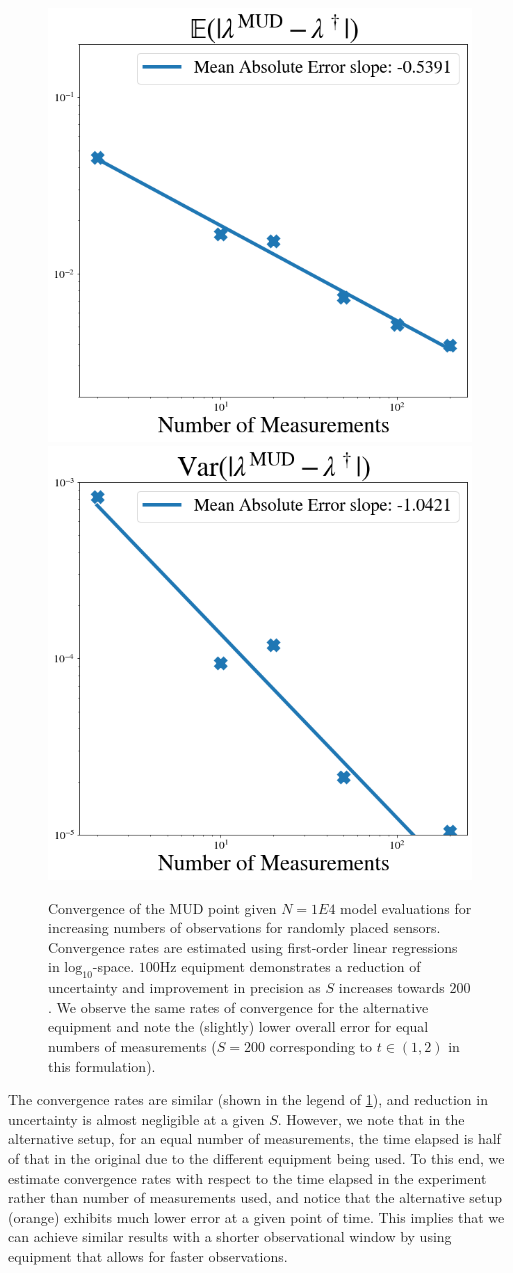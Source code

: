 \begin{figure}[htbp]
  \centering
  \includegraphics[width=0.475\linewidth]{figures/ode/ode_convergence_mud_obs_mean}
  \includegraphics[width=0.425\linewidth]{figures/ode/ode_convergence_mud_obs_var}

  \caption{Convergence of the MUD point given $N=1E4$ model evaluations for increasing numbers of observations for randomly placed sensors.
  Convergence rates are estimated using first-order linear regressions in $\text{log}_{10}$-space.
  $100$Hz equipment demonstrates a reduction of uncertainty and improvement in precision as $S$ increases towards $200$.
  We observe the same rates of convergence for the alternative equipment and note the (slightly) lower overall error for equal numbers of measurements ($S=200$ corresponding to $t\in (1,2)$ in this formulation).
  }
  \label{fig:ode-convergence-obs}
\end{figure}

The convergence rates are similar (shown in the legend of \ref{fig:ode-convergence-obs}), and reduction in uncertainty is almost negligible at a given $S$.
However, we note that in the alternative setup, for an equal number of measurements, the time elapsed is half of that in the original due to the different equipment being used.
To this end, we estimate convergence rates with respect to the time elapsed in the experiment rather than number of measurements used, and notice that the alternative setup (orange) exhibits much lower error at a given point of time.
This implies that we can achieve similar results with a shorter observational window by using equipment that allows for faster observations.



